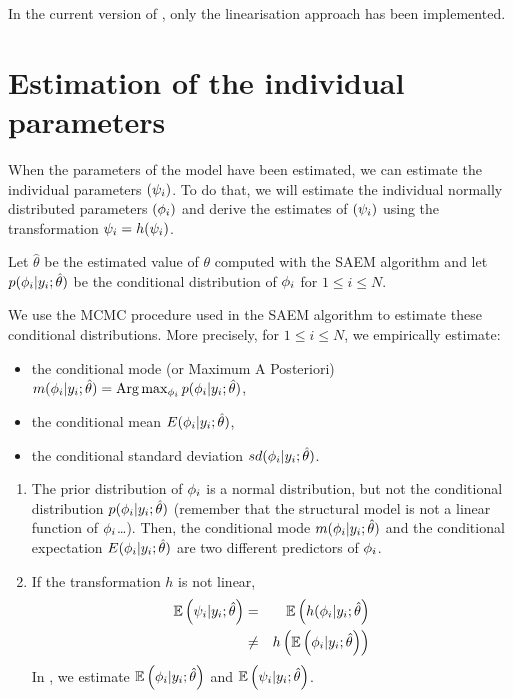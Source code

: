 In the current version of \monolix, only the linearisation approach has been implemented.

\section{Estimation of the individual parameters} \label{section_indivparam}

When the parameters of the model have been estimated, we can estimate the individual parameters $({\psi_i})$. To do that, we will estimate the individual normally distributed parameters $({{\phi}_i})$ and derive the estimates of $({\psi_i})$ using the transformation ${\psi_i}= h({\psi_i})$.

Let $\hat{\theta}$ be the estimated value of $\theta$ computed with the SAEM algorithm and let $p({{\phi}_i}|y_i;\hat{\theta})$ be the conditional distribution of ${{\phi}_i}$ for $1\leq i \leq N$.

We use the MCMC procedure used in the SAEM algorithm to estimate these conditional distributions. More precisely, for $1\leq i \leq N$, we empirically estimate:

\begin{itemize}
  \item the conditional mode (or Maximum A Posteriori)
  $ m({{\phi}_i}|y_i;\hat{\theta})={\rm Arg}\max_{{\phi}_i} p({{\phi}_i}|y_i;\hat{\theta})$,
  \item the conditional mean
  $ E({{\phi}_i}|y_i;\hat{\theta})$,
  \item the conditional standard deviation
 $ sd({{\phi}_i}|y_i;\hat{\theta})$.
 \end{itemize}

 \begin{enumerate}
  \item The prior distribution of ${{\phi}_i}$ is a normal distribution, but not the conditional distribution $p({{\phi}_i}|y_i;\hat{\theta})$ (remember that the structural model is not a linear function of ${{\phi}_i}$\ldots). Then, the conditional mode $m({{\phi}_i}|y_i;\hat{\theta})$ and the conditional expectation $ E({{\phi}_i}|y_i;\hat{\theta})$ are two different predictors of ${{\phi}_i}$.
  \item If the transformation $h$ is not linear,
      \begin{eqnarray*}
       \mathbb{E}\left({\psi_i}|y_i;\hat{\theta}\right) &=&  \mathbb{E}\left(h({{\phi}_i}|y_i;\hat{\theta}\right) \\
       &\neq& h\left(\mathbb{E}\left({{\phi}_i}|y_i;\hat{\theta}\right)  \right)
       \end{eqnarray*}
       In \monolix, we estimate $\mathbb{E}\left({{\phi}_i}|y_i;\hat{\theta}\right)$ and $\mathbb{E}\left({\psi_i}|y_i;\hat{\theta}\right)$.
\end{enumerate}

